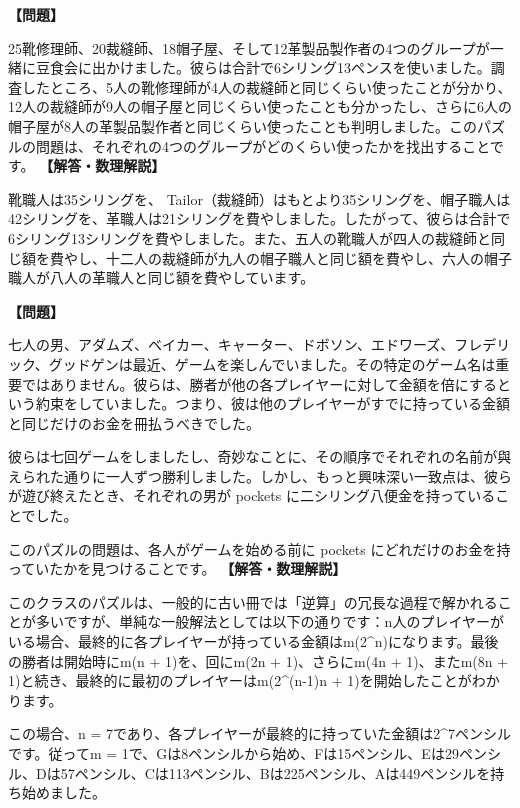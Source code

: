\documentclass[10pt,a4paper,oneside,openany]{ltjsbook}
\begin{document}
\begin{tcolorbox}[colback=softblue,colframe=primaryblue,title=\textbf{第 4 問：ビーンフェストの謎題 （原題: THE BEANFEAST PUZZLE.）},arc=2mm,boxrule=1pt,breakable]
\textbf{【問題】}\par\vspace{0.3em}
25靴修理師、20裁縫師、18帽子屋、そして12革製品製作者の4つのグループが一緒に豆食会に出かけました。彼らは合計で6シリング13ペンスを使いました。調査したところ、5人の靴修理師が4人の裁縫師と同じくらい使ったことが分かり、12人の裁縫師が9人の帽子屋と同じくらい使ったことも分かったし、さらに6人の帽子屋が8人の革製品製作者と同じくらい使ったことも判明しました。このパズルの問題は、それぞれの4つのグループがどのくらい使ったかを找出することです。
\tcblower
\textbf{【解答・数理解説】}\par\vspace{0.3em}
靴職人は35シリングを、 Tailor（裁縫師）はもとより35シリングを、帽子職人は42シリングを、革職人は21シリングを費やしました。したがって、彼らは合計で6シリング13シリングを費やしました。また、五人の靴職人が四人の裁縫師と同じ額を費やし、十二人の裁縫師が九人の帽子職人と同じ額を費やし、六人の帽子職人が八人の革職人と同じ額を費やしています。
\end{tcolorbox}

\begin{tcolorbox}[colback=softblue,colframe=primaryblue,title=\textbf{第 5 問：不思議な偶然 （原題: A QUEER COINCIDENCE.）},arc=2mm,boxrule=1pt,breakable]
\textbf{【問題】}\par\vspace{0.3em}
七人の男、アダムズ、ベイカー、キャーター、ドボソン、エドワーズ、フレデリック、グッドゲンは最近、ゲームを楽しんでいました。その特定のゲーム名は重要ではありません。彼らは、勝者が他の各プレイヤーに対して金額を倍にするという約束をしていました。つまり、彼は他のプレイヤーがすでに持っている金額と同じだけのお金を冊払うべきでした。

彼らは七回ゲームをしましたし、奇妙なことに、その順序でそれぞれの名前が與えられた通りに一人ずつ勝利しました。しかし、もっと興味深い一致点は、彼らが遊び終えたとき、それぞれの男が pockets に二シリング八便金を持っていることでした。

このパズルの問題は、各人がゲームを始める前に pockets にどれだけのお金を持っていたかを見つけることです。
\tcblower
\textbf{【解答・数理解説】}\par\vspace{0.3em}
このクラスのパズルは、一般的に古い冊では「逆算」の冗長な過程で解かれることが多いですが、単純な一般解法としては以下の通りです：n人のプレイヤーがいる場合、最終的に各プレイヤーが持っている金額はm(2\textasciicircum{}n)になります。最後の勝者は開始時にm(n + 1)を、回にm(2n + 1)、さらにm(4n + 1)、またm(8n + 1)と続き、最終的に最初のプレイヤーはm(2\textasciicircum{}(n-1)n + 1)を開始したことがわかります。

この場合、n = 7であり、各プレイヤーが最終的に持っていた金額は2\textasciicircum{}7ペンシルです。従ってm = 1で、Gは8ペンシルから始め、Fは15ペンシル、Eは29ペンシル、Dは57ペンシル、Cは113ペンシル、Bは225ペンシル、Aは449ペンシルを持ち始めました。
\end{tcolorbox}
\end{document}
